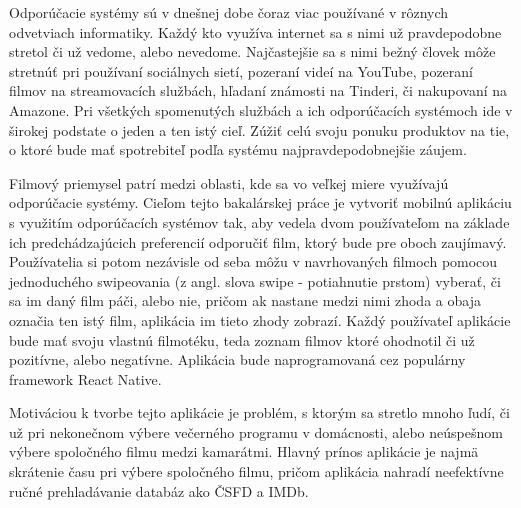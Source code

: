 
Odporúčacie systémy sú v dnešnej dobe čoraz viac používané v rôznych odvetviach informatiky. Každý kto využíva internet sa s nimi už pravdepodobne stretol či už vedome, alebo nevedome. Najčastejšie sa s nimi bežný človek môže stretnúť pri používaní sociálnych sietí, pozeraní videí na YouTube, pozeraní filmov na streamovacích službách, hľadaní známosti na Tinderi, či nakupovaní na Amazone. Pri všetkých spomenutých službách a ich odporúčacích systémoch ide v širokej podstate o jeden a ten istý cieľ. Zúžiť celú svoju ponuku produktov na tie, o ktoré bude mať spotrebiteľ podľa systému najpravdepodobnejšie záujem. \par
Filmový priemysel patrí medzi oblasti, kde sa vo veľkej miere využívajú odporúčacie systémy. Cieľom tejto bakalárskej práce je vytvoriť mobilnú aplikáciu s využitím odporúčacích systémov tak, aby vedela dvom používateľom na základe ich predchádzajúcich preferencií odporučiť film, ktorý bude pre oboch zaujímavý. Používatelia si potom nezávisle od seba môžu v navrhovaných filmoch pomocou jednoduchého swipeovania (z angl. slova swipe - potiahnutie prstom) vyberať, či sa im daný film páči, alebo nie, pričom ak nastane medzi nimi zhoda a obaja označia ten istý film, aplikácia im tieto zhody zobrazí. Každý používateľ aplikácie bude mať svoju vlastnú filmotéku, teda zoznam filmov ktoré ohodnotil či už pozitívne, alebo negatívne. Aplikácia bude naprogramovaná cez populárny framework React Native. \par
Motiváciou k tvorbe tejto aplikácie je problém, s ktorým sa stretlo mnoho ľudí, či už pri nekonečnom výbere večerného programu v domácnosti, alebo neúspešnom výbere spoločného filmu medzi kamarátmi. Hlavný prínos aplikácie je najmä skrátenie času pri výbere spoločného filmu, pričom aplikácia nahradí neefektívne ručné prehladávanie databáz ako ČSFD a IMDb. \par
